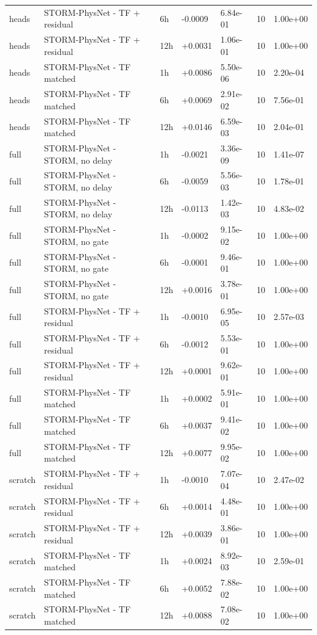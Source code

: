 \begin{tabular}{lllllrl}
heads & STORM-PhysNet - TF + residual & 6h & -0.0009 & 6.84e-01 & 10 & 1.00e+00 \\
heads & STORM-PhysNet - TF + residual & 12h & +0.0031 & 1.06e-01 & 10 & 1.00e+00 \\
heads & STORM-PhysNet - TF matched & 1h & +0.0086 & 5.50e-06 & 10 & 2.20e-04 \\
heads & STORM-PhysNet - TF matched & 6h & +0.0069 & 2.91e-02 & 10 & 7.56e-01 \\
heads & STORM-PhysNet - TF matched & 12h & +0.0146 & 6.59e-03 & 10 & 2.04e-01 \\
full & STORM-PhysNet - STORM, no delay & 1h & -0.0021 & 3.36e-09 & 10 & 1.41e-07 \\
full & STORM-PhysNet - STORM, no delay & 6h & -0.0059 & 5.56e-03 & 10 & 1.78e-01 \\
full & STORM-PhysNet - STORM, no delay & 12h & -0.0113 & 1.42e-03 & 10 & 4.83e-02 \\
full & STORM-PhysNet - STORM, no gate & 1h & -0.0002 & 9.15e-02 & 10 & 1.00e+00 \\
full & STORM-PhysNet - STORM, no gate & 6h & -0.0001 & 9.46e-01 & 10 & 1.00e+00 \\
full & STORM-PhysNet - STORM, no gate & 12h & +0.0016 & 3.78e-01 & 10 & 1.00e+00 \\
full & STORM-PhysNet - TF + residual & 1h & -0.0010 & 6.95e-05 & 10 & 2.57e-03 \\
full & STORM-PhysNet - TF + residual & 6h & -0.0012 & 5.53e-01 & 10 & 1.00e+00 \\
full & STORM-PhysNet - TF + residual & 12h & +0.0001 & 9.62e-01 & 10 & 1.00e+00 \\
full & STORM-PhysNet - TF matched & 1h & +0.0002 & 5.91e-01 & 10 & 1.00e+00 \\
full & STORM-PhysNet - TF matched & 6h & +0.0037 & 9.41e-02 & 10 & 1.00e+00 \\
full & STORM-PhysNet - TF matched & 12h & +0.0077 & 9.95e-02 & 10 & 1.00e+00 \\
scratch & STORM-PhysNet - TF + residual & 1h & -0.0010 & 7.07e-04 & 10 & 2.47e-02 \\
scratch & STORM-PhysNet - TF + residual & 6h & +0.0014 & 4.48e-01 & 10 & 1.00e+00 \\
scratch & STORM-PhysNet - TF + residual & 12h & +0.0039 & 3.86e-01 & 10 & 1.00e+00 \\
scratch & STORM-PhysNet - TF matched & 1h & +0.0024 & 8.92e-03 & 10 & 2.59e-01 \\
scratch & STORM-PhysNet - TF matched & 6h & +0.0052 & 7.88e-02 & 10 & 1.00e+00 \\
scratch & STORM-PhysNet - TF matched & 12h & +0.0088 & 7.08e-02 & 10 & 1.00e+00 \\
\bottomrule
\end{tabular}
